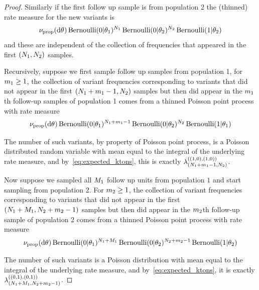 \begin{proof}
    Similarly if the first follow up sample is from population 2 the (thinned) rate measure for the new variants is  
    $$
    \ratemeasproposed(\de\vecvariantfreq{})\BER(0|\variantfreqperpop{1})^{\samplesize{1}}\BER(0|\variantfreqperpop{2})^{\samplesize{2}} \BER(1|\variantfreqperpop{2})
    $$
    and these are independent of the collection of frequencies that appeared in the first $(N_{1}, N_{2})$ samples.

    Recursively, suppose we first sample follow up samples from population 1, for $m_{1}\ge 1$, the collection of variant frequencies corresponding to variants that did not appear in the first $(N_{1}+m_{1}-1, N_{2})$ samples but then did appear in the $m_{1}$th follow-up samples of population 1 comes from a thinned Poisson point process with rate measure
    \begin{align*}
        \ratemeasproposed(\de\vecvariantfreq{})\BER(0|\variantfreqperpop{1})^{\samplesize{1}+\followupidx{1}-1}\BER(0|\variantfreqperpop{2})^{\samplesize{2}} \BER(1|\variantfreqperpop{1})
    \end{align*}

    The number of such variants, by property of Poisson point process, is a Poisson distributed random variable with mean equal to the integral of the underlying rate measure, and by~\cref{eq:expected_ktons}, this is exactly $\lambda_{(N_{1}+m_{1}-1,N_{2})}^{((1,0),(1,0))}$. 
    
    Now suppose we sampled all $M_{1}$ follow up units from population $1$ and start sampling from population 2. For $m_{2}\ge 1$, the collection of variant frequencies corresponding to variants that did not appear in the first $(N_{1}+M_{1}, N_{2}+m_{2}-1)$ samples but then did appear in the $m_{2}$th follow-up sample of population 2 comes from a thinned Poisson point process with rate measure
    \begin{align*}
        \ratemeasproposed(\de\vecvariantfreq{})\BER(0|\variantfreqperpop{1})^{\samplesize{1}+\futuresamplesize{1}}\BER(0|\variantfreqperpop{2})^{\samplesize{2}+\followupidx{2}-1} \BER(1|\variantfreqperpop{2})
    \end{align*}

    The number of such variants is a Poisson distribution with mean equal to the integral of the underlying rate measure, and by~\cref{eq:expected_ktons}, it is exactly $\lambda_{(N_{1}+M_{1},N_{2}+m_{2}-1)}^{((0,1),(0,1))}$. 


\end{proof}
